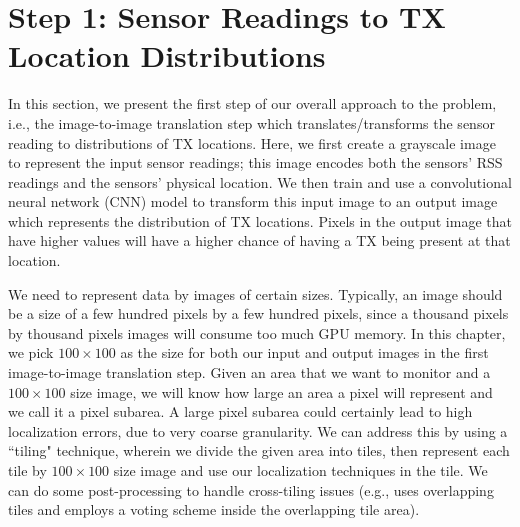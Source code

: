 \section{\our Step 1: Sensor Readings to TX Location Distributions}
\label{sec:translate}

In this section, we present the first step of our overall approach to the \mtl problem, i.e., 
the image-to-image translation step which translates/transforms the sensor reading to distributions
of TX locations. Here, we first create a grayscale image to represent the input sensor readings;
this image encodes both the sensors' RSS readings and the sensors' physical location. We then train and use
a convolutional neural network (CNN) model to transform this input image
to an output image which represents the distribution of TX locations. Pixels in the output image that have higher values will have a higher chance of having a TX being present at that location. 
 
We need to represent data by images of certain sizes.
Typically, an image should be a size of a few hundred pixels by a few hundred pixels, since a thousand pixels by thousand pixels images will consume too much GPU memory.
In this chapter, we pick $100\times 100$ as the size for both our input and output images in the first image-to-image translation step.
Given an area that we want to monitor and a $100\times100$ size image, we will know how large an area a pixel will represent and we call it a pixel subarea.
A large pixel subarea could certainly lead to high localization errors, due
to very coarse granularity. We can address this by using a ``tiling"
technique, wherein we divide the given area into tiles, then represent each 
tile by $100\times100$ size image and use our localization techniques in the tile.
We can do some post-processing to handle cross-tiling issues (e.g., \cite{icccn20-deeptxfinder} uses overlapping tiles and employs a voting scheme inside the overlapping tile area).
 
